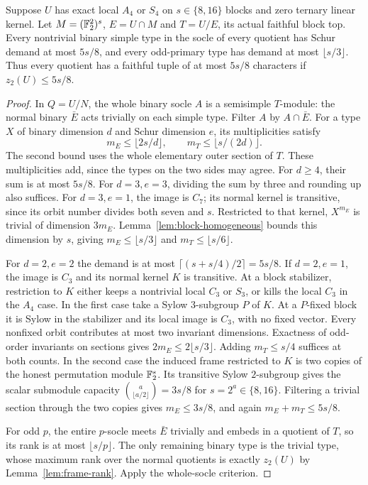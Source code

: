 \begin{lemma}
\label{lem:small-power-socle}
Suppose $U$ has exact local $A_4$ or $S_4$ on $s\in\{8,16\}$
blocks and zero ternary linear kernel. Let $M=(\mathbb F_2^2)^s$,
$E=U\cap M$ and $T=U/E$, its actual faithful block top.
Every nontrivial binary simple type in the socle of every quotient
has Schur demand at most $5s/8$, and every odd-primary type has
demand at most $\lfloor s/3\rfloor$. Thus every quotient has a
faithful tuple of at most $5s/8$ characters if $z_2(U)\leq5s/8$.
\end{lemma}
\begin{proof}
In $Q=U/N$, the whole binary socle $A$ is a semisimple $T$-module:
the normal binary $\bar E$ acts trivially on each simple type.
Filter $A$ by $A\cap\bar E$. For a type $X$ of binary dimension
$d$ and Schur dimension $e$, its multiplicities satisfy
\[
 m_E\leq\lfloor2s/d\rfloor,\qquad
 m_T\leq\lfloor s/(2d)\rfloor.
\]
The second bound uses the whole elementary outer section of $T$.
These multiplicities add, since the types on the two sides may agree.
For $d\geq4$, their sum is at most $5s/8$. For $d=3,e=3$,
dividing the sum by three and rounding up also suffices.
For $d=3,e=1$, the image is $C_7$; its normal kernel is transitive,
since its orbit number divides both seven and $s$. Restricted to
that kernel, $X^{m_E}$ is trivial of dimension $3m_E$.
Lemma~\ref{lem:block-homogeneous} bounds this dimension by $s$,
giving $m_E\leq\lfloor s/3\rfloor$ and
$m_T\leq\lfloor s/6\rfloor$.

For $d=2,e=2$ the demand is at most
$\lceil(s+s/4)/2\rceil=5s/8$. If $d=2,e=1$, the image is
$C_3$ and its normal kernel $K$ is transitive. At a block
stabilizer, restriction to $K$ either keeps a nontrivial local
$C_3$ or $S_3$, or kills the local $C_3$ in the $A_4$ case.
In the first case take a Sylow $3$-subgroup $P$ of $K$. At a
$P$-fixed block it is Sylow in the stabilizer and its local image
is $C_3$, with no fixed vector. Every nonfixed orbit contributes
at most two invariant dimensions. Exactness of odd-order invariants
on sections gives $2m_E\leq2\lfloor s/3\rfloor$.
Adding $m_T\leq s/4$ suffices at both counts.
In the second case the induced frame restricted to $K$ is two
copies of the honest permutation module $\mathbb F_2^s$. Its transitive
Sylow $2$-subgroup gives the scalar submodule capacity
$\binom a{\lfloor a/2\rfloor}=3s/8$ for $s=2^a\in\{8,16\}$.
Filtering a trivial section through the two copies gives
$m_E\leq3s/8$, and again $m_E+m_T\leq5s/8$.

For odd $p$, the entire $p$-socle meets $\bar E$ trivially and
embeds in a quotient of $T$, so its rank is at most $\lfloor s/p\rfloor$.
The only remaining binary type is the trivial type, whose maximum
rank over the normal quotients is exactly $z_2(U)$ by
Lemma~\ref{lem:frame-rank}. Apply the whole-socle criterion.
\end{proof}

